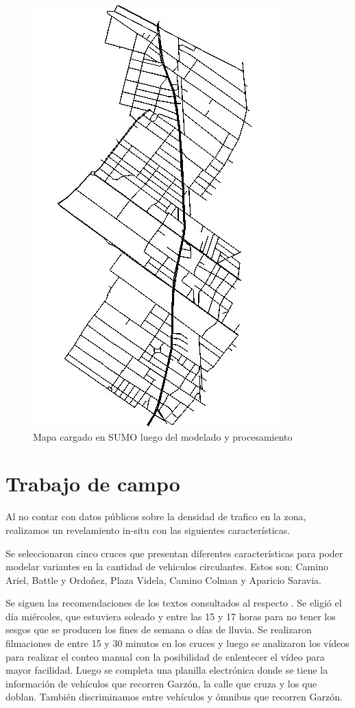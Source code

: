 \begin{figure}[H]
	\centering
	\includegraphics[width=0.5\linewidth]{Figures/mapa_sumo}
	\caption{Mapa cargado en SUMO luego del modelado y procesamiento}
	\label{fig:mapa_sumo}
\end{figure}



\section{Trabajo de campo}
Al no contar con datos públicos sobre la densidad de trafico en la zona, realizamos un revelamiento in-situ con las siguientes características.

Se seleccionaron cinco cruces que presentan diferentes características para poder modelar variantes en la cantidad de vehiculos circulantes.
Estos son: Camino Ariel, Battle y Ordoñez, Plaza Videla, Camino Colman y Aparicio Saravia.

Se siguen las recomendaciones de los textos consultados al respecto \citep{ConteoTrafico}. Se eligió el día miércoles, que estuviera soleado y entre las 15 y 17 horas para no tener los sesgos que se producen los fines de semana o días de lluvia.
Se realizaron filmaciones de entre 15 y 30 minutos en los cruces y luego se analizaron los vídeos para realizar el conteo manual con la posibilidad de enlentecer el vídeo para mayor facilidad. Luego se completa una planilla electrónica donde se tiene la información de vehículos que recorren Garzón, la calle que cruza y los que doblan. También discriminamos entre vehículos y ómnibus que recorren Garzón.

